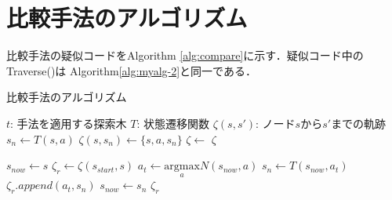 \section{比較手法のアルゴリズム}
比較手法の疑似コードをAlgorithm \ref{alg:compare}に示す．疑似コード中のTraverse()は Algorithm\ref{alg:myalg-2}と同一である．
\begin{algorithm}
    \caption{比較手法のアルゴリズム}
    \label{alg:compare}
    \begin{algorithmic}[1]       
        \State $t$: 手法を適用する探索木
        \State $T$: 状態遷移関数
        \State $\zeta(s, s')$: ノード$s$から$s'$までの軌跡
           \State $s_n \gets T(s, a)$
           \State $\zeta(s, s_n) \gets \{s, a, s_n\}$
           \State $\zeta \gets$ 
           \Return $\zeta$
        \EndFunction
        
            \State $s_{now} \gets s$
            \State $\zeta_r \gets \zeta(s_{start}, s)$
                \State $a_t \gets {\underset{a}{\textrm{argmax}}} N(s_{now}, a)$
                \State $s_n \gets T(s_{now}, a_t)$
                \State $\zeta_r.append({a_t, s_n})$
                \State $s_{now} \gets s_n$
            \EndWhile
            \Return $\zeta_r$
        \EndFunction
       
        
    \end{algorithmic}
\end{algorithm}

\pagebreak
